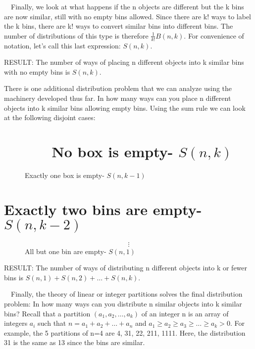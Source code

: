 \documentclass{article}
\begin{document}
\ \ Finally, we look at what happens if the n objects are different but the k bins are now similar, still with no empty
bins allowed. Since there are k! ways to label the k bins, there are k! ways to convert similar bins into different
bins. The number of distributions of this type is therefore  $\frac 1{k!}B(n,k)$.  For convenience of notation, let’s
call this last expression:  $S\left(n,k\right).$ 

RESULT: The number of ways of placing n different objects into k similar bins with no empty bins is 
$S\left(n,k\right).$\ \ 

There is one additional distribution problem that we can analyze using the machinery developed thus far. In how many
ways can you place n different objects into k similar bins allowing empty bins. Using the sum rule we can look at the
following disjoint cases:

\section[\ \ \ \ \ \ No box is empty{}-  ]{\ \ \ \ \ \ No box is empty-  $S(n,k)$ }
\ \ \ \ \ \ Exactly one box is empty- $S(n,k-1)$

\section[Exactly two bins are empty{}-]{Exactly two bins are empty- $S(n,k-2)$}
\begin{equation*}
{\vdots}
\end{equation*}
\ \ \ \ \ \ All but one bin are empty- $S(n,1)$

RESULT: The number of ways of distributing n different objects into k or fewer bins is 
$S\left(n,1\right)+S\left(n,2\right)+{\dots}+S(n,k)$.

\ \ Finally, the theory of linear or integer partitions solves the final distribution problem: In how many ways can you
distribute n similar objects into k similar bins? Recall that a partition    $\left(a_1,a_2,{\dots},a_k\right)$ of an
integer n is an array of integers  $a_i$ such that  $n=a_1+a_2+{\dots}+a_n$ and 
$a_1{\geq}a_2{\geq}a_3{\geq}{\dots}{\geq}a_k>0$.  For example, the 5 partitions of n=4 are 4, 31, 22, 211, 1111. Here,
the distribution 31 is the same as 13 since the bins are similar. 
\end{document}
